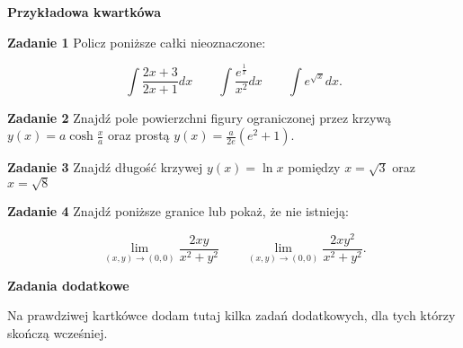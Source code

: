 \documentclass[a4paper,11pt]{article}
\begin{document}
\begin{center}
  {\large\textbf{Przykładowa kwartkówa}}
\end{center}

\hrulefill

\bigskip

\textbf{Zadanie 1} Policz poniższe całki nieoznaczone:

\[
\int \frac{2x+3}{2x+1} dx 
\quad \quad 
\int \frac{e^{\frac{1}{x}}}{x^2} dx
\quad \quad
\int e^{\sqrt{x}}  dx
.\] 

\bigskip

\textbf{Zadanie 2} Znajdź pole powierzchni figury ograniczonej przez
krzywą $y(x) = a \cosh \frac{x}{a}$ oraz prostą $y(x) = \frac{a}{2e} (e^2
+ 1)$.

\bigskip

\textbf{Zadanie 3} Znajdź długość krzywej $y(x) = \ln x$ pomiędzy $x =
\sqrt{3} $ oraz $x=\sqrt{8}$ 

\bigskip

\textbf{Zadanie 4} Znajdź poniższe granice lub pokaż, że nie istnieją:

\[
\lim_{(x,y)\to (0,0)} \frac{2xy}{x^2 + y^2}
\quad \quad
\lim_{(x,y) \to (0,0)} \frac{2xy^2}{x^2 + y^2}
.\] 

\hrulefill

\begin{center}
    \textbf{Zadania dodatkowe}
\end{center}

Na prawdziwej kartkówce dodam tutaj kilka zadań dodatkowych, dla tych
którzy skończą wcześniej.
\end{document}
